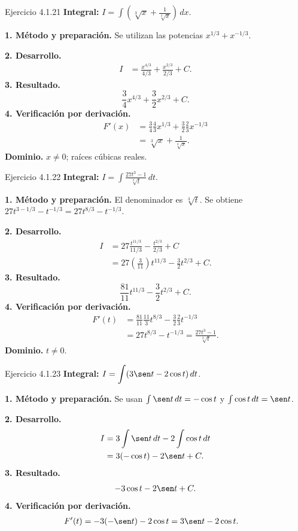 \begin{examplebox}{Ejercicio 4.1.21}
\textbf{Integral:} $\displaystyle I=\int \left(\sqrt[3]x+\frac1{\sqrt[3]x}\right)\,dx$.

\textbf{1. Método y preparación.} Se utilizan las potencias $x^{1/3}+x^{-1/3}$.

\textbf{2. Desarrollo.}
\begin{align*}
I&=\frac{x^{4/3}}{4/3}+\frac{x^{2/3}}{2/3}+C.
\end{align*}
\textbf{3. Resultado.}
\[
\frac34x^{4/3}+\frac32x^{2/3}+C.
\]
\textbf{4. Verificación por derivación.}
\begin{align*}
F'(x)&=\frac34\frac43x^{1/3}+\frac32\frac23x^{-1/3}\\&=\sqrt[3]x+\frac1{\sqrt[3]x}.
\end{align*}
\textbf{Dominio.} $x\ne0$; raíces cúbicas reales.
\end{examplebox}

\begin{examplebox}{Ejercicio 4.1.22}
\textbf{Integral:} $\displaystyle I=\int \frac{27t^3-1}{\sqrt[3]t}\,dt$.

\textbf{1. Método y preparación.} El denominador es $\sqrt[3]t$. Se obtiene $27t^{3-1/3}-t^{-1/3}=27t^{8/3}-t^{-1/3}$.

\textbf{2. Desarrollo.}
\begin{align*}
I&=27\frac{t^{11/3}}{11/3}-\frac{t^{2/3}}{2/3}+C\\&=27\left(\frac3{11}\right)t^{11/3}-\frac32t^{2/3}+C.
\end{align*}
\textbf{3. Resultado.}
\[
\frac{81}{11}t^{11/3}-\frac32t^{2/3}+C.
\]
\textbf{4. Verificación por derivación.}
\begin{align*}
F'(t)&=\frac{81}{11}\frac{11}3t^{8/3}-\frac32\frac23t^{-1/3}\\&=27t^{8/3}-t^{-1/3}=\frac{27t^3-1}{\sqrt[3]t}.
\end{align*}
\textbf{Dominio.} $t\ne0$.
\end{examplebox}

\begin{examplebox}{Ejercicio 4.1.23}
\textbf{Integral:} $\displaystyle I=\int (3\sen t-2\cos t)\,dt$.

\textbf{1. Método y preparación.} Se usan $\int\sen t\,dt=-\cos t$ y $\int\cos t\,dt=\sen t$.

\textbf{2. Desarrollo.}
\begin{align*}
I&=3\int\sen t\,dt-2\int\cos t\,dt\\&=3(-\cos t)-2\sen t+C.
\end{align*}
\textbf{3. Resultado.}
\[
-3\cos t-2\sen t+C.
\]
\textbf{4. Verificación por derivación.}
\begin{align*}
F'(t)&=-3(-\sen t)-2\cos t=3\sen t-2\cos t.
\end{align*}
\end{examplebox}


